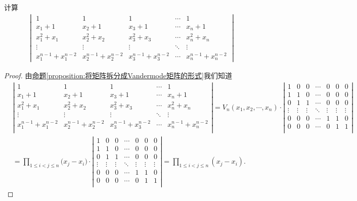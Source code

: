 \documentclass[../../main.tex]{subfiles}%
\begin{document}
\begin{example}
计算
\begin{align*}
\begin{vmatrix}
1&1&1&\cdots&1\\
x_1 + 1&x_2 + 1&x_3 + 1&\cdots&x_n + 1\\
x_1^2 + x_1&x_2^2 + x_2&x_3^2 + x_3&\cdots&x_n^2 + x_n\\
\vdots&\vdots&\vdots&\ddots&\vdots\\
x_1^{n - 1} + x_1^{n - 2}&x_2^{n - 1} + x_2^{n - 2}&x_3^{n - 1} + x_3^{n - 2}&\cdots&x_n^{n - 1} + x_n^{n - 2}
\end{vmatrix}
\end{align*}
\end{example}
\begin{proof}
由\hyperref[proposition:将矩阵拆分成Vandermode矩阵的形式]{命题\ref{proposition:将矩阵拆分成Vandermode矩阵的形式}}我们知道
\begin{align*}
&\left| \begin{matrix}
1&		1&		1&		\cdots&		1\\
x_1+1&		x_2+1&		x_3+1&		\cdots&		x_n+1\\
x_{1}^{2}+x_1&		x_{2}^{2}+x_2&		x_{3}^{2}+x_3&		\cdots&		x_{n}^{2}+x_n\\
\vdots&		\vdots&		\vdots&		\ddots&		\vdots\\
x_{1}^{n-1}+x_{1}^{n-2}&		x_{2}^{n-1}+x_{2}^{n-2}&		x_{3}^{n-1}+x_{3}^{n-2}&		\cdots&		x_{n}^{n-1}+x_{n}^{n-2}\\
\end{matrix} \right|=V_n\left( x_1,x_2,\cdots ,x_n \right) \cdot \left| \begin{matrix}
1&		0&		0&		\cdots&		0&		0&		0\\
1&		1&		0&		\cdots&		0&		0&		0\\
0&		1&		1&		\cdots&		0&		0&		0\\
\vdots&		\vdots&		\vdots&		\ddots&		\vdots&		\vdots&		\vdots\\
0&		0&		0&		\cdots&		1&		1&		0\\
0&		0&		0&		\cdots&		0&		1&		1\\
\end{matrix} \right|
\\
&=\prod_{1\leqslant i<j\leqslant n}{(x_j}-x_i)\cdot \left| \begin{matrix}
1&		0&		0&		\cdots&		0&		0&		0\\
1&		1&		0&		\cdots&		0&		0&		0\\
0&		1&		1&		\cdots&		0&		0&		0\\
\vdots&		\vdots&		\vdots&		\ddots&		\vdots&		\vdots&		\vdots\\
0&		0&		0&		\cdots&		1&		1&		0\\
0&		0&		0&		\cdots&		0&		1&		1\\
\end{matrix} \right|=\prod_{1\leqslant i<j\leqslant n}{\left( x_j-x_i \right)}.
\end{align*} 
\end{proof}
\end{document}
